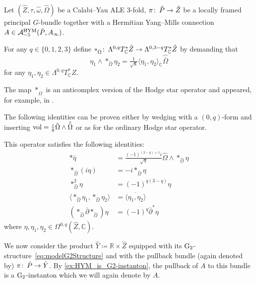 \documentclass[11pt,a4paper]{scrartcl}
\newcommand{\col}{\colon \thinspace}
\newcommand{\vol}{\textup{vol}}
\newcommand{\G}{\textup{G}}
\numberwithin{equation}{section}
\theoremstyle{plain}
\theoremstyle{definition}
\theoremstyle{remark}
\begin{document}
Let $(\hat{Z},\tau,\hat{\omega},\hat{\Omega})$ be a Calabi--Yau ALE $3$-fold, $\pi \col \hat{P} \to \hat{Z}$ be a locally framed principal $G$-bundle together with a Hermitian Yang--Mills connection $A \in \mathcal{A}_{-5}^{\textup{HYM}}(\hat{P},A_\infty)$. 

\begin{definition}\label{def:anticomplex_HodgeStar}
For any $q\in \{0,1,2,3\}$ define $*_{\hat{\Omega}} \col \Lambda^{0,q}T^*_\mathbb{C} \hat{Z}\to \Lambda^{0,3-q}T^*_\mathbb{C} \hat{Z}$ by demanding that \[ \eta_1 \wedge *_{\hat{\Omega}} \eta_2 = \tfrac{1}{\sqrt{8}} \langle \eta_1, \eta_2 \rangle_{\mathbb{C}} \hat{\bar{\Omega}} \] for any $\eta_1,\eta_2 \in \Lambda^{0,q}T^*_\mathbb{C} \hat{Z}$.
\end{definition}

\begin{remark}
The map $*_{\hat{\Omega}}$ is an anticomplex version of the Hodge star operator and appeared, for example, in \cite[Section~2]{DonaldsonThomas-HigherDimGaugeTheory}.
\end{remark}
The following identities can be proven either by wedging with a $(0,q)$-form and inserting $\vol = \frac{i}{8} \hat{\Omega}\wedge\hat{\bar{\Omega}}$ or as for the ordinary Hodge star operator.
\begin{lemma}\label{lem:anticomplex-HodgeStar}
This operator satisfies the following identities:
\begin{align*}
*\bar{\eta}&= \tfrac{(-1)^{(3-q)+1}i}{\sqrt{8}} \hat{\Omega} \wedge *_{\hat{\Omega}} \eta\\
*_{\hat{\Omega}}(i\eta) &= -i *_{\hat{\Omega}}\eta \\
*_{\hat{\Omega}}^2 \eta &= (-1)^{q(3-q)} \eta\\
\langle *_{\hat{\Omega}} \eta_1,*_{\hat{\Omega}} \eta_2 \rangle&= \overline{\langle  \eta_1,\eta_2 \rangle}\\
({*_{\hat{\Omega}} \bar{\partial} *_{\hat{\Omega}}}) \eta &= (-1)^q \bar{\partial}^* \eta
\end{align*}
where $\eta,\eta_1,\eta_2\in\Omega^{0,q}(\hat{Z},\mathbb{C})$.
\end{lemma}

We now consider the product $\hat{Y}\coloneqq \mathbb{R}\times \hat{Z}$ equipped with its $\G_2$-structure~\eqref{eq:modelG2Structure} and with the pullback bundle (again denoted by) $\pi \col \hat{P} \to \hat{Y}$. By \autoref{ex:HYM_is_G2-instanton}, the pullback of $A$ to this bundle is a $\G_2$-instanton which we will again denote by $A$. 
\end{document}

